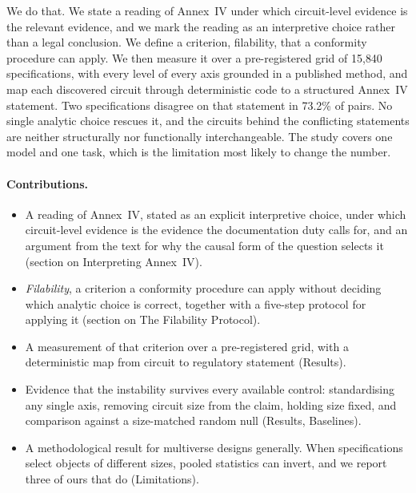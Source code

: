 \documentclass[letterpaper]{article} %
\begin{document}
We do that. We state a reading of Annex~IV under which circuit-level evidence is
the relevant evidence, and we mark the reading as an interpretive choice rather
than a legal conclusion. We define a criterion, filability, that a conformity
procedure can apply. We then measure it over a pre-registered grid of 15{,}840
specifications, with every level of every axis grounded in a published
method, and map each discovered circuit through deterministic code to a
structured Annex~IV statement. Two specifications disagree on that statement in 73.2\% of
pairs. No single analytic choice rescues it, and the circuits
behind the conflicting statements are neither structurally nor functionally
interchangeable. The study covers one model and one task, which is the
limitation most likely to change the number.

\paragraph{Contributions.}
\begin{itemize}\itemsep1pt
\item A reading of Annex~IV, stated as an explicit interpretive choice, under
which circuit-level evidence is the evidence the documentation duty calls for,
and an argument from the text for why the causal form of the question selects
it (section on Interpreting Annex~IV).
\item \emph{Filability}, a criterion a conformity procedure can apply without
deciding which analytic choice is correct, together with a five-step protocol
for applying it (section on The Filability Protocol).
\item A measurement of that criterion over a pre-registered grid, with a
deterministic map from circuit to regulatory statement (Results).
\item Evidence that the instability survives every available control:
standardising any single axis, removing circuit size from the claim, holding
size fixed, and comparison against a size-matched random null (Results,
Baselines).
\item A methodological result for multiverse designs generally. When
specifications select objects of different sizes, pooled statistics can invert,
and we report three of ours that do (Limitations).
\end{itemize}

%
\end{document}
